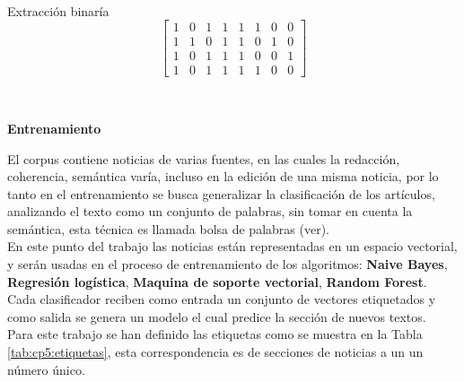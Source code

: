 \ \\

\begin{mygraybox}[label={box:cp5:binario}]{Extracción binaría} 
\begin{equation*}
\begin{bmatrix}
1 & 0 & 1 & 1 & 1 & 1 & 0 & 0\\
1 & 1 & 0 & 1 & 1 & 0 & 1 & 0\\
1 & 0 & 1 & 1 & 1 & 0 & 0 & 1\\
1 & 0 & 1 & 1 & 1 & 1 & 0 & 0 
\end{bmatrix}
\end{equation*}
\end{mygraybox}

\ \\

\begin{large}
\textbf{Entrenamiento}\\
\end{large}


El corpus contiene noticias de varias fuentes, en  las cuales la redacción, coherencia, semántica varía, incluso en la edición de una misma noticia, por lo tanto en el entrenamiento se busca generalizar la clasificación de los artículos, analizando el texto como un conjunto de palabras, sin tomar en cuenta la semántica, esta técnica es llamada bolsa de palabras (ver).\\

En este punto del trabajo las noticias están representadas en un espacio vectorial, y serán usadas en el proceso de entrenamiento de los algoritmos: \textbf{Naive Bayes}, \textbf{Regresión logística}, \textbf{Maquina de soporte vectorial}, \textbf{Random Forest}. Cada clasificador reciben como entrada un conjunto de vectores etiquetados y como salida se genera un modelo el cual predice la sección de nuevos textos.\\ 

Para este trabajo se han definido las etiquetas como se muestra en la Tabla \ref{tab:cp5:etiquetas}, esta correspondencia es de secciones de noticias a un un número único.


